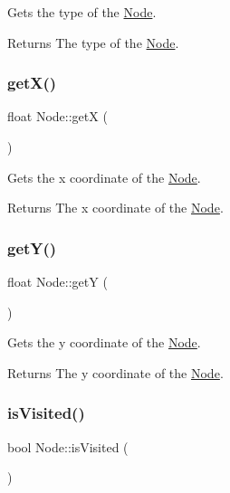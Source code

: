 Gets the type of the \mbox{\hyperlink{class_node}{Node}}. 

\begin{DoxyReturn}{Returns}
The type of the \mbox{\hyperlink{class_node}{Node}}. 
\end{DoxyReturn}
\mbox{\label{class_node_a98ba03ab2272a479d3173932a40c3a41}} 
\subsubsection{\texorpdfstring{getX()}{getX()}}
{\footnotesize\ttfamily float Node\+::getX (\begin{DoxyParamCaption}{ }\end{DoxyParamCaption})}



Gets the x coordinate of the \mbox{\hyperlink{class_node}{Node}}. 

\begin{DoxyReturn}{Returns}
The x coordinate of the \mbox{\hyperlink{class_node}{Node}}. 
\end{DoxyReturn}
\mbox{\label{class_node_a55366d94e5244071158b45b31c43dd8b}} 
\subsubsection{\texorpdfstring{getY()}{getY()}}
{\footnotesize\ttfamily float Node\+::getY (\begin{DoxyParamCaption}{ }\end{DoxyParamCaption})}



Gets the y coordinate of the \mbox{\hyperlink{class_node}{Node}}. 

\begin{DoxyReturn}{Returns}
The y coordinate of the \mbox{\hyperlink{class_node}{Node}}. 
\end{DoxyReturn}
\mbox{\label{class_node_a91d335587ff4158d88771feccf361b74}} 
\subsubsection{\texorpdfstring{isVisited()}{isVisited()}}
{\footnotesize\ttfamily bool Node\+::is\+Visited (\begin{DoxyParamCaption}{ }\end{DoxyParamCaption})}




